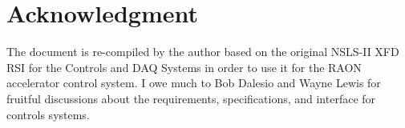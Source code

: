 \documentclass[11pt
  , a4paper
  , article
  , oneside
]{memoir}
\begin{document}
\chapter{Acknowledgment}
The document is re-compiled by the author based on the original NSLS-II XFD RSI for the Controls and DAQ Systems \cite{LT-C-XFD-RSI-CO-001} in order to use it for the RAON accelerator control system. I owe much to Bob Dalesio and Wayne Lewis for fruitful discussions about the requirements, specifications, and interface for controls systems.


\printglossaries


\clearpage
%
%
%

%

\end{document}
